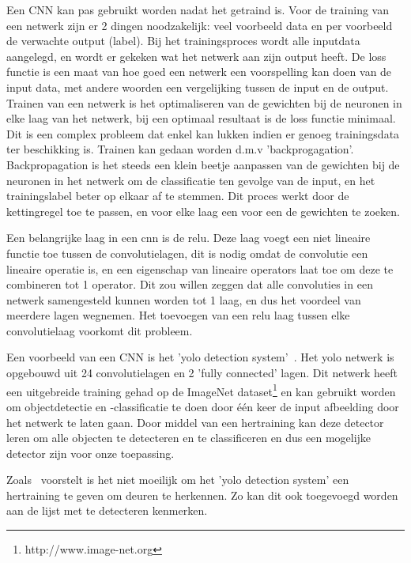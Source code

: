             Een CNN kan pas gebruikt worden nadat het getraind is. Voor de training van een netwerk zijn er 2 dingen noodzakelijk: veel voorbeeld data en per voorbeeld de verwachte output (label).
            Bij het trainingsproces wordt alle inputdata aangelegd, en wordt er gekeken wat het netwerk aan zijn output heeft.
            De loss functie is een maat van hoe goed een netwerk een voorspelling kan doen van de input data, met andere woorden een vergelijking tussen de input en de output.
            Trainen van een netwerk is het optimaliseren van de gewichten bij de neuronen in elke laag van het netwerk, bij een optimaal resultaat is de loss functie minimaal.
            Dit is een complex probleem dat enkel kan lukken indien er genoeg trainingsdata ter beschikking is.
            Trainen kan gedaan worden d.m.v 'backprogagation'.
            Backpropagation is het steeds een klein beetje aanpassen van de gewichten bij de neuronen in het netwerk om de classificatie ten gevolge van de input, en het trainingslabel beter op elkaar af te stemmen.
            Dit proces werkt door de kettingregel toe te passen, en voor elke laag een voor een de gewichten te zoeken.

            Een belangrijke laag in een \gls{cnn} is de \gls{relu}.
            Deze laag voegt een niet lineaire functie toe tussen de convolutielagen, dit is nodig omdat de convolutie een lineaire operatie is, en een eigenschap van lineaire operators laat toe om deze te combineren tot 1 operator.
            Dit zou willen zeggen dat alle convoluties in een netwerk samengesteld kunnen worden tot 1 laag, en dus het voordeel van meerdere lagen wegnemen.
            Het toevoegen van een \gls{relu} laag tussen elke convolutielaag voorkomt dit probleem.

            Een voorbeeld van een CNN is het '\gls{yolo} detection system'~\cite{Redmon_2016}. Het \gls{yolo} netwerk is opgebouwd uit 24 convolutielagen en 2 'fully connected' lagen.
            Dit netwerk heeft een uitgebreide training gehad op de ImageNet dataset\footnote{http://www.image-net.org} en kan gebruikt worden om objectdetectie en -classificatie te doen door \'{e}\'{e}n keer de input afbeelding door het netwerk te laten gaan.
            Door middel van een hertraining kan deze detector leren om alle objecten te detecteren en te classificeren en dus een mogelijke detector zijn voor onze toepassing.

            Zoals~\cite{Llopart2017} voorstelt is het niet moeilijk om het '\gls{yolo} detection system' een hertraining te geven om deuren te herkennen. Zo kan dit ook toegevoegd worden aan de lijst met te detecteren kenmerken. 



